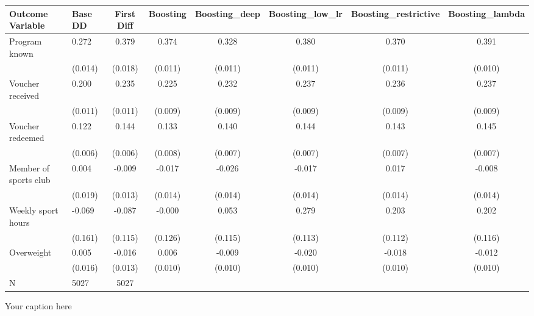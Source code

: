 \begin{adjustbox}{angle=90}
\begin{tabular}{llcccccc}
\hline
Outcome Variable & Base DD & First Diff & Boosting & Boosting_deep & Boosting_low_lr & Boosting_restrictive & Boosting_lambda \\
\hline
Program known & 0.272 & 0.379 & 0.374 & 0.328 & 0.380 & 0.370 & 0.391 \\
  & (0.014) & (0.018) & (0.011) & (0.011) & (0.011) & (0.011) & (0.010) \\
Voucher received & 0.200 & 0.235 & 0.225 & 0.232 & 0.237 & 0.236 & 0.237 \\
  & (0.011) & (0.011) & (0.009) & (0.009) & (0.009) & (0.009) & (0.009) \\
Voucher redeemed & 0.122 & 0.144 & 0.133 & 0.140 & 0.144 & 0.143 & 0.145 \\
  & (0.006) & (0.006) & (0.008) & (0.007) & (0.007) & (0.007) & (0.007) \\
Member of sports club & 0.004 & -0.009 & -0.017 & -0.026 & -0.017 & 0.017 & -0.008 \\
  & (0.019) & (0.013) & (0.014) & (0.014) & (0.014) & (0.014) & (0.014) \\
Weekly sport hours & -0.069 & -0.087 & -0.000 & 0.053 & 0.279 & 0.203 & 0.202 \\
  & (0.161) & (0.115) & (0.126) & (0.115) & (0.113) & (0.112) & (0.116) \\
Overweight & 0.005 & -0.016 & 0.006 & -0.009 & -0.020 & -0.018 & -0.012 \\
  & (0.016) & (0.013) & (0.010) & (0.010) & (0.010) & (0.010) & (0.010) \\
\hline
N & 5027 & 5027  &  &  &  &  \\
\hline
\end{tabular}
\caption{Your caption here}
\label{tab:your_label}
\end{adjustbox}